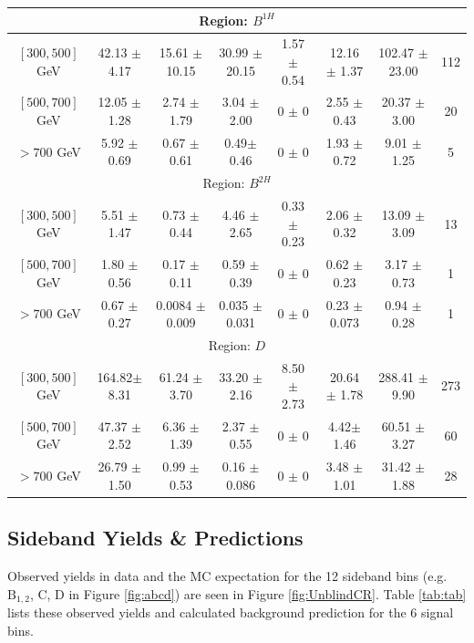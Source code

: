 \begin{landscape}
\begin{table}
\begin{tabular}{c|c|c|c|c|c|c|c|}
\\ \hline
\multicolumn{8}{c}{Region: $B^{1H}$}  \\ \hline \hline
$[300,500]$ GeV & 42.13 $\pm$ 4.17& 15.61 $\pm$ 10.15 & 30.99 $\pm$ 20.15 & 1.57 $\pm$ 0.54 & 12.16 $\pm$ 1.37   & 102.47 $\pm$ 23.00 & 112  \\ \hline
$[500,700]$ GeV & 12.05 $\pm$ 1.28 & 2.74 $\pm$ 1.79 & 3.04 $\pm$ 2.00 & 0 $\pm$ 0 & 2.55 $\pm$ 0.43   & 20.37 $\pm$ 3.00 & 20\\  \hline
$>700$ GeV  &5.92 $\pm$ 0.69& 0.67 $\pm$ 0.61& 0.49$\pm$ 0.46 & 0 $\pm$ 0 & 1.93 $\pm$ 0.72   & 9.01 $\pm$ 1.25 & 5  \\  \hline  
\multicolumn{8}{c}{Region: $B^{2H}$}  \\ \hline \hline
$[300,500]$ GeV & 5.51 $\pm$ 1.47 & 0.73 $\pm$ 0.44 & 4.46 $\pm$ 2.65 & 0.33 $\pm$ 0.23 & 2.06 $\pm$ 0.32 & 13.09 $\pm$ 3.09 & 13 
\\ \hline
$[500,700]$ GeV & 1.80 $\pm$ 0.56 & 0.17 $\pm$ 0.11 & 0.59 $\pm$ 0.39 & 0 $\pm$ 0 & 0.62 $\pm$ 0.23 & 3.17 $\pm$ 0.73 & 1 \\ \hline
$>700$ GeV  & 0.67 $\pm$ 0.27 & 0.0084 $\pm$ 0.009& 0.035 $\pm$ 0.031& 0 $\pm$ 0 & 0.23 $\pm$ 0.073   & 0.94 $\pm$ 0.28 & 1  \\  \hline  
\multicolumn{8}{c}{Region: $D$}  \\ \hline \hline
$[300,500]$ GeV & 164.82$\pm$ 8.31 & 61.24 $\pm$ 3.70 & 33.20 $\pm$ 2.16 & 8.50 $\pm$ 2.73 & 20.64 $\pm$ 1.78   & 288.41 $\pm$ 9.90 & 273  \\ \hline
$[500,700]$ GeV & 47.37 $\pm$ 2.52 & 6.36 $\pm$ 1.39 & 2.37 $\pm$ 0.55 & 0 $\pm$ 0 & 4.42$\pm$ 1.46 &   60.51 $\pm$ 3.27 & 60\\  \hline
$>700$ GeV  & 26.79 $\pm$ 1.50 & 0.99 $\pm$ 0.53 & 0.16 $\pm$ 0.086 & 0 $\pm$ 0 & 3.48 $\pm$ 1.01  & 31.42 $\pm$ 1.88& 28  \\  \hline  
\end{tabular}
\label{tab:MCCorrControl}
\end{table}
\end{landscape}

\subsection{Sideband Yields \& Predictions}

Observed yields in data and the MC expectation for the 12 sideband bins (e.g. $\mathrm{B}_{1, 2}$, C, D in Figure \ref{fig:abcd}) are seen in Figure \ref{fig:UnblindCR}. Table \ref{tab:tab} lists these observed yields and calculated background prediction for the 6 signal bins.

